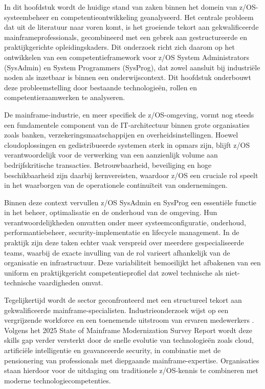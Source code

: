 In dit hoofdstuk wordt de huidige stand van zaken binnen het domein van z/OS-systeembeheer en competentieontwikkeling geanalyseerd.
Het centrale probleem dat uit de literatuur naar voren komt, is het groeiende tekort aan gekwalificeerde mainframeprofessionals, gecombineerd met een gebrek aan gestructureerde en praktijkgerichte opleidingskaders.
Dit onderzoek richt zich daarom op het ontwikkelen van een competentieframework voor z/OS System Administrators (SysAdmin) en System Programmers (SysProg), dat zowel aansluit bij industriële noden als inzetbaar is binnen een onderwijscontext.
Dit hoofdstuk onderbouwt deze probleemstelling door bestaande technologieën, rollen en competentieraamwerken te analyseren.

De mainframe-industrie, en meer specifiek de z/OS-omgeving, vormt nog steeds een fundamentele component van de IT-architectuur binnen grote organisaties zoals banken, verzekeringsmaatschappijen en overheidsinstellingen. Hoewel cloudoplossingen en gedistribueerde systemen sterk in opmars zijn, blijft z/OS verantwoordelijk voor de verwerking van een aanzienlijk volume aan bedrijfskritische transacties. Betrouwbaarheid, beveiliging en hoge beschikbaarheid zijn daarbij kernvereisten, waardoor z/OS een cruciale rol speelt in het waarborgen van de operationele continuïteit van ondernemingen.

Binnen deze context vervullen z/OS SysAdmin en SysProg een essentiële functie in het beheer, optimalisatie en de onderhoud van de omgeving. Hun verantwoordelijkheden omvatten onder meer systeemconfiguratie, onderhoud, performantiebeheer, security-implementatie en lifecycle management. In de praktijk zijn deze taken echter vaak verspreid over meerdere gespecialiseerde teams, waarbij de exacte invulling van de rol varieert afhankelijk van de organisatie en infrastructuur. Deze variabiliteit bemoeilijkt het afbakenen van een uniform en praktijkgericht competentieprofiel dat zowel technische als niet-technische vaardigheden omvat.

Tegelijkertijd wordt de sector geconfronteerd met een structureel tekort aan gekwalificeerde mainframe-specialisten. Industrieonderzoek wijst op een vergrijzende workforce en een toenemende uitstroom van ervaren medewerkers \autocite{BMC2024}. Volgens het 2025 State of Mainframe Modernization Survey Report \autocite{Kyndryl2025} wordt deze skills gap verder versterkt door de snelle evolutie van technologieën zoals cloud, artificiële intelligentie en geavanceerde security, in combinatie met de pensionering van professionals met diepgaande mainframe-expertise. Organisaties staan hierdoor voor de uitdaging om traditionele z/OS-kennis te combineren met moderne technologiecompetenties.

